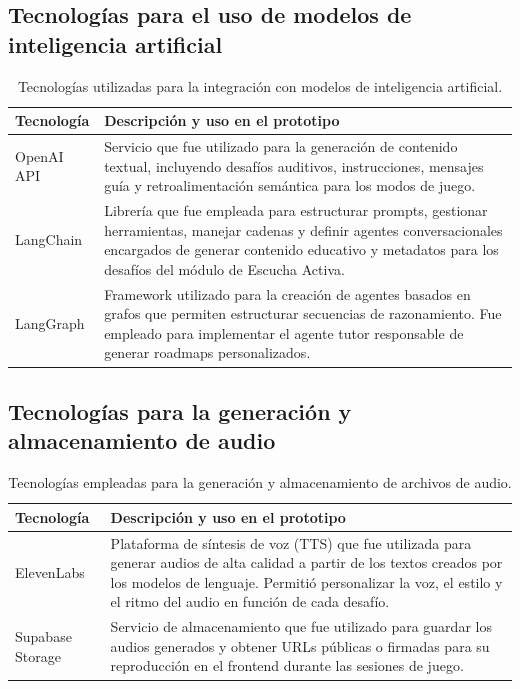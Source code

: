 \subsection{Tecnologías para el uso de modelos de inteligencia artificial}

\begin{table}[H]
\centering
\footnotesize
\begin{tabular}{| m{3.5cm} | m{11cm} |}
\hline
\textbf{Tecnología} & \textbf{Descripción y uso en el prototipo} \\
\hline
OpenAI API & Servicio que fue utilizado para la generación de contenido textual, incluyendo desafíos auditivos, instrucciones, mensajes guía y retroalimentación semántica para los modos de juego. \\
\hline
LangChain & Librería que fue empleada para estructurar prompts, gestionar herramientas, manejar cadenas y definir agentes conversacionales encargados de generar contenido educativo y metadatos para los desafíos del módulo de Escucha Activa. \\
\hline
LangGraph & Framework utilizado para la creación de agentes basados en grafos que permiten estructurar secuencias de razonamiento. Fue empleado para implementar el agente tutor responsable de generar roadmaps personalizados. \\
\hline
\end{tabular}
\caption{Tecnologías utilizadas para la integración con modelos de inteligencia artificial.}
\end{table}

\subsection{Tecnologías para la generación y almacenamiento de audio}

\begin{table}[H]
\centering
\footnotesize
\begin{tabular}{| m{3.5cm} | m{11cm} |}
\hline
\textbf{Tecnología} & \textbf{Descripción y uso en el prototipo} \\
\hline
ElevenLabs & Plataforma de síntesis de voz (TTS) que fue utilizada para generar audios de alta calidad a partir de los textos creados por los modelos de lenguaje. Permitió personalizar la voz, el estilo y el ritmo del audio en función de cada desafío. \\
\hline
Supabase Storage & Servicio de almacenamiento que fue utilizado para guardar los audios generados y obtener URLs públicas o firmadas para su reproducción en el frontend durante las sesiones de juego. \\
\hline
\end{tabular}
\caption{Tecnologías empleadas para la generación y almacenamiento de archivos de audio.}
\end{table}

